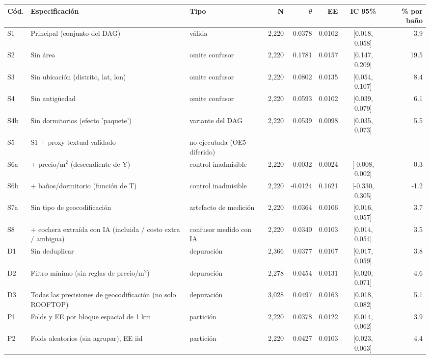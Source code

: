 \begin{tabular}{llp{3.2cm}rrrcr}
\toprule
Cód. & Especificación & Tipo & N & $\theta$ & EE & IC 95\% & \% por baño \\
\midrule
S1 & Principal (conjunto del DAG) & válida & 2,220 & 0.0378 & 0.0102 & [0.018, 0.058] & 3.9 \\
S2 & Sin área & omite confusor & 2,220 & 0.1781 & 0.0157 & [0.147, 0.209] & 19.5 \\
S3 & Sin ubicación (distrito, lat, lon) & omite confusor & 2,220 & 0.0802 & 0.0135 & [0.054, 0.107] & 8.4 \\
S4 & Sin antigüedad & omite confusor & 2,220 & 0.0593 & 0.0102 & [0.039, 0.079] & 6.1 \\
S4b & Sin dormitorios (efecto 'paquete') & variante del DAG & 2,220 & 0.0539 & 0.0098 & [0.035, 0.073] & 5.5 \\
S5 & S1 + proxy textual validado & no ejecutada (OE5 diferido) & -- & -- & -- & -- & -- \\
S6a & + precio/m$^2$ (descendiente de Y) & control inadmisible & 2,220 & -0.0032 & 0.0024 & [-0.008, 0.002] & -0.3 \\
S6b & + baños/dormitorio (función de T) & control inadmisible & 2,220 & -0.0124 & 0.1621 & [-0.330, 0.305] & -1.2 \\
S7a & Sin tipo de geocodificación & artefacto de medición & 2,220 & 0.0364 & 0.0106 & [0.016, 0.057] & 3.7 \\
S8 & + cochera extraída con IA (incluida / costo extra / ambigua) & confusor medido con IA & 2,220 & 0.0340 & 0.0103 & [0.014, 0.054] & 3.5 \\
D1 & Sin deduplicar & depuración & 2,366 & 0.0377 & 0.0107 & [0.017, 0.059] & 3.8 \\
D2 & Filtro mínimo (sin reglas de precio/m$^2$) & depuración & 2,278 & 0.0454 & 0.0131 & [0.020, 0.071] & 4.6 \\
D3 & Todas las precisiones de geocodificación (no solo ROOFTOP) & depuración & 3,028 & 0.0497 & 0.0163 & [0.018, 0.082] & 5.1 \\
P1 & Folds y EE por bloque espacial de 1 km & partición & 2,220 & 0.0378 & 0.0122 & [0.014, 0.062] & 3.9 \\
P2 & Folds aleatorios (sin agrupar), EE iid & partición & 2,220 & 0.0427 & 0.0103 & [0.023, 0.063] & 4.4 \\
\bottomrule
\end{tabular}